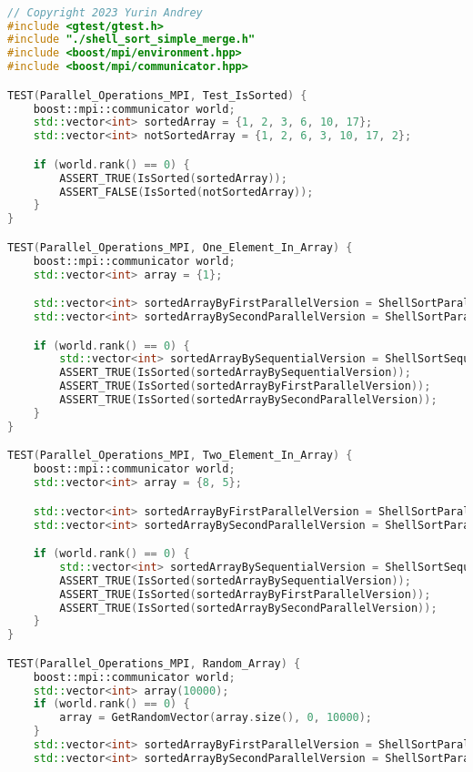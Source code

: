 \documentclass{report}
\begin{document}
\newpage
\begin{lstlisting}[language=C++,caption=main файл]

// Copyright 2023 Yurin Andrey
#include <gtest/gtest.h>
#include "./shell_sort_simple_merge.h"
#include <boost/mpi/environment.hpp>
#include <boost/mpi/communicator.hpp>

TEST(Parallel_Operations_MPI, Test_IsSorted) {
    boost::mpi::communicator world;
    std::vector<int> sortedArray = {1, 2, 3, 6, 10, 17};
    std::vector<int> notSortedArray = {1, 2, 6, 3, 10, 17, 2};

    if (world.rank() == 0) {
        ASSERT_TRUE(IsSorted(sortedArray));
        ASSERT_FALSE(IsSorted(notSortedArray));
    }
}

TEST(Parallel_Operations_MPI, One_Element_In_Array) {
    boost::mpi::communicator world;
    std::vector<int> array = {1};

    std::vector<int> sortedArrayByFirstParallelVersion = ShellSortParallel(array);
    std::vector<int> sortedArrayBySecondParallelVersion = ShellSortParallel(array, true);

    if (world.rank() == 0) {
        std::vector<int> sortedArrayBySequentialVersion = ShellSortSequential(array);
        ASSERT_TRUE(IsSorted(sortedArrayBySequentialVersion));
        ASSERT_TRUE(IsSorted(sortedArrayByFirstParallelVersion));
        ASSERT_TRUE(IsSorted(sortedArrayBySecondParallelVersion));
    }
}

TEST(Parallel_Operations_MPI, Two_Element_In_Array) {
    boost::mpi::communicator world;
    std::vector<int> array = {8, 5};

    std::vector<int> sortedArrayByFirstParallelVersion = ShellSortParallel(array);
    std::vector<int> sortedArrayBySecondParallelVersion = ShellSortParallel(array, true);

    if (world.rank() == 0) {
        std::vector<int> sortedArrayBySequentialVersion = ShellSortSequential(array);
        ASSERT_TRUE(IsSorted(sortedArrayBySequentialVersion));
        ASSERT_TRUE(IsSorted(sortedArrayByFirstParallelVersion));
        ASSERT_TRUE(IsSorted(sortedArrayBySecondParallelVersion));
    }
}

TEST(Parallel_Operations_MPI, Random_Array) {
    boost::mpi::communicator world;
    std::vector<int> array(10000);
    if (world.rank() == 0) {
        array = GetRandomVector(array.size(), 0, 10000);
    }
    std::vector<int> sortedArrayByFirstParallelVersion = ShellSortParallel(array);
    std::vector<int> sortedArrayBySecondParallelVersion = ShellSortParallel(array, true);


\end{lstlisting}
\end{document}

